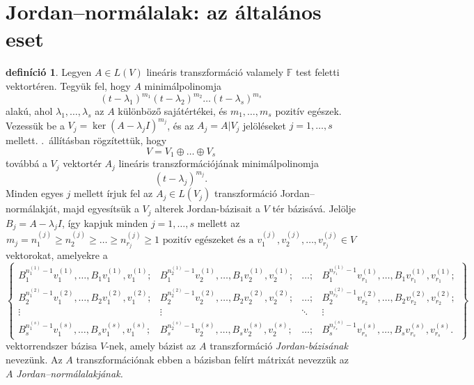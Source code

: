 \documentclass[9pt, a4paper, showtrims]{memoir}
\let\Aref\relax
\theoremstyle{plain}
\theoremstyle{remark}
\theoremstyle{definition}
\newtheorem{definition}[proposition]{definíció}
\begin{document}
\section{Jordan--normálalak: az általános eset}
\begin{definition}
    Legyen $A\in L\left( V \right)$ lineáris transzformáció valamely $\mathbb{F}$ test
    feletti vektortéren.
    Tegyük fel, hogy $A$ minimálpolinomja
    \[
        \left( t-\lambda_1 \right)^{m_1}\left( t-\lambda_2 \right)^{m_2}\dots\left( t-\lambda_s \right)^{m_s}
    \]
    alakú, ahol $\lambda_1,\dots,\lambda_s$ az $A$ különböző sajátértékei,
    és $m_1,\dots,m_s$ pozitív egészek.
    Vezessük be a $V_j=\ker\left( A-\lambda_j I \right)^{m_j}$, 
    és az $A_j=A|V_j$ jelöléseket $j=1,\dots,s$ mellett.
    \Aref{pr:redukcio-primfelbontas}.~állításban rögzítettük, hogy
    \[
        V=V_1\oplus\dots\oplus V_s
    \]
    továbbá a $V_j$ vektortér $A_j$ lineáris transzformációjának minimálpolinomja
    \[
        \left( t-\lambda_j \right)^{m_j}.
    \]
    Minden egyes $j$ mellett írjuk fel az $A_j\in L\left( V_j \right)$ transzformáció
    Jordan--normálakját,
    majd egyesítsük a $V_j$ alterek Jordan-bázisait a $V$ tér bázisává. 
    Jelölje $B_j=A-\lambda_j I$,
    így kapjuk minden $j=1,\dots,s$ mellett
    az
    \[
        m_j=n_1^{(j)}\geq n_2^{(j)}\geq\dots\geq n_{r_j}^{(j)}\geq 1
        \text{ pozitív egészeket és a }
        v_1^{(j)},v_2^{(j)},\dots,v_{r_j}^{(j)}\in V
    \]
    vektorokat, amelyekre a
    \[
    \begin{Bmatrix}
        B_1^{n_1^{(1)}-1}v_1^{(1)},\dots,B_1v_1^{(1)},v_1^{(1)};
        &
        B_1^{n_2^{(1)}-1}v_2^{(1)},\dots,B_1v_2^{(1)},v_2^{(1)};
        &
        \dots ;
        &
        B_1^{n_{r_1}^{(1)}-1}v_{r_1}^{(1)},\dots,B_1v_{r_1}^{(1)},v_{r_1}^{(1)};
    \\
        B_2^{n_1^{(2)}-1}v_1^{(2)},\dots,B_2v_1^{(2)},v_1^{(2)};
        &
        B_2^{n_2^{(2)}-1}v_2^{(2)},\dots,B_2v_2^{(2)},v_2^{(2)};
        &
        \dots ;
        &
        B_2^{n_{r_2}^{(2)}-1}v_{r_2}^{(2)},\dots,B_2v_{r_2}^{(2)},v_{r_2}^{(2)};
    \\
        \vdots&\vdots&\ddots&\vdots
    \\
        B_s^{n_1^{(s)}-1}v_1^{(s)},\dots,B_sv_1^{(s)},v_1^{(s)};
        &
        B_s^{n_2^{(s)}-1}v_2^{(s)},\dots,B_sv_2^{(s)},v_2^{(s)};
        &
        \dots ;
        &
        B_s^{n_{r_s}^{(s)}-1}v_{r_s}^{(s)},\dots,B_sv_{r_s}^{(s)},v_{r_s}^{(s)}.
    \end{Bmatrix}
    \]
    vektorrendszer bázisa $V$-nek, amely bázist az $A$ transzformáció \emph{Jordan-bázisának} nevezünk.
    Az $A$ transzformációnak ebben a bázisban felírt mátrixát nevezzük az $A$ \emph{Jordan--normálalakjának.}
\end{definition}
\end{document}
